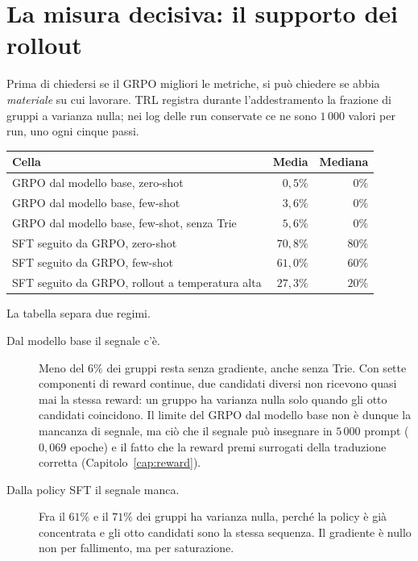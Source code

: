\section{La misura decisiva: il supporto dei rollout}
\label{sec:supporto}

Prima di chiedersi se il GRPO migliori le metriche, si può chiedere se abbia
\emph{materiale} su cui lavorare. TRL registra durante l'addestramento la
frazione di gruppi a varianza nulla; nei log delle run conservate ce ne sono
$1\,000$ valori per run, uno ogni cinque passi.

\begin{center}
\begin{tabular}{lrr}
\toprule
Cella & Media & Mediana \\
\midrule
GRPO dal modello base, zero-shot & $0{,}5\%$ & $0\%$ \\
GRPO dal modello base, few-shot & $3{,}6\%$ & $0\%$ \\
GRPO dal modello base, few-shot, senza Trie & $5{,}6\%$ & $0\%$ \\
\midrule
SFT seguito da GRPO, zero-shot & $70{,}8\%$ & $80\%$ \\
SFT seguito da GRPO, few-shot & $61{,}0\%$ & $60\%$ \\
SFT seguito da GRPO, rollout a temperatura alta & $27{,}3\%$ & $20\%$ \\
\bottomrule
\end{tabular}
\end{center}

La tabella separa due regimi.

\begin{description}
  \item[Dal modello base il segnale c'è.] Meno del $6\%$ dei gruppi resta senza
        gradiente, anche senza Trie. Con sette componenti di reward continue,
        due candidati diversi non ricevono quasi mai la stessa reward: un gruppo
        ha varianza nulla solo quando gli otto candidati coincidono. Il limite
        del GRPO dal modello base non è dunque la mancanza di segnale, ma ciò
        che il segnale può insegnare in $5\,000$ prompt ($0{,}069$ epoche) e il
        fatto che la reward premi surrogati della traduzione corretta
        (Capitolo~\ref{cap:reward}).
  \item[Dalla policy SFT il segnale manca.] Fra il $61\%$ e il $71\%$ dei
        gruppi ha varianza nulla, perché la policy è già concentrata e gli otto
        candidati sono la stessa sequenza. Il gradiente è nullo non per
        fallimento, ma per saturazione.
\end{description}

